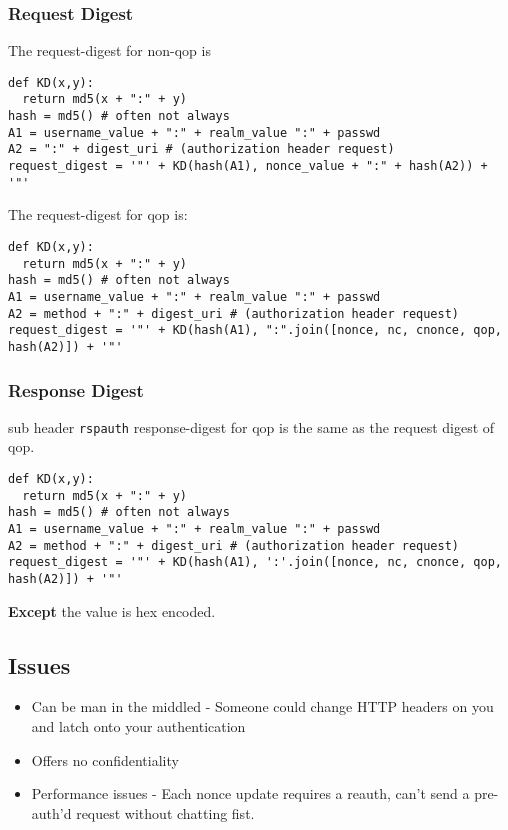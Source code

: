 \documentclass[../CMPUT-404-Notes.tex]{subfiles}
\begin{document}
\subsubsection{Request Digest}
The request-digest for non-qop is 
\begin{listing}[!h]
\begin{verbatim}
def KD(x,y):
  return md5(x + ":" + y)
hash = md5() # often not always
A1 = username_value + ":" + realm_value ":" + passwd
A2 = ":" + digest_uri # (authorization header request)
request_digest = '"' + KD(hash(A1), nonce_value + ":" + hash(A2)) + '"'
\end{verbatim}
\end{listing}

The request-digest for qop is:
\begin{listing}[!h]
\begin{verbatim}
def KD(x,y):
  return md5(x + ":" + y)
hash = md5() # often not always
A1 = username_value + ":" + realm_value ":" + passwd
A2 = method + ":" + digest_uri # (authorization header request)
request_digest = '"' + KD(hash(A1), ":".join([nonce, nc, cnonce, qop, hash(A2)]) + '"'
\end{verbatim}
\end{listing}

\subsubsection{Response Digest}
sub header \texttt{rspauth} 
response-digest for qop is the same as the request digest of qop.
\begin{listing}[!h]
\begin{verbatim}
def KD(x,y):
  return md5(x + ":" + y)
hash = md5() # often not always
A1 = username_value + ":" + realm_value ":" + passwd
A2 = method + ":" + digest_uri # (authorization header request)
request_digest = '"' + KD(hash(A1), ':'.join([nonce, nc, cnonce, qop, hash(A2)]) + '"'
\end{verbatim}
\end{listing}
\textbf{Except} the value is hex encoded.

\subsection{Issues}
\begin{itemize}
  \item Can be man in the middled - Someone could change HTTP headers on you and latch onto your authentication
  \item Offers no confidentiality
  \item Performance issues - Each nonce update requires a reauth, can't send a pre-auth'd request without chatting fist.
\end{itemize}
\end{document}

